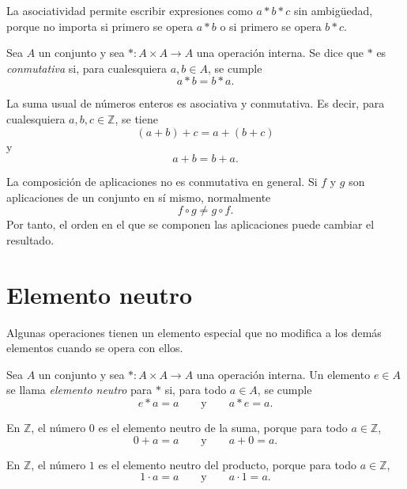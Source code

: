 La asociatividad permite escribir expresiones como \(a*b*c\) sin ambigüedad, porque no importa si primero se opera \(a*b\) o si primero se opera \(b*c\).

\begin{definicion}[Conmutatividad]
Sea \(A\) un conjunto y sea \(*:A\times A\to A\) una operación interna. Se dice que \(*\) es \emph{conmutativa} si, para cualesquiera \(a,b\in A\), se cumple
\[
  a*b=b*a.
\]
\end{definicion}

\begin{ejemplo}
La suma usual de números enteros es asociativa y conmutativa. Es decir, para cualesquiera \(a,b,c\in\mathbb{Z}\), se tiene
\[
  (a+b)+c=a+(b+c)
\]
y
\[
  a+b=b+a.
\]
\end{ejemplo}

\begin{ejemplo}
La composición de aplicaciones no es conmutativa en general. Si \(f\) y \(g\) son aplicaciones de un conjunto en sí mismo, normalmente
\[
  f\circ g\neq g\circ f.
\]
Por tanto, el orden en el que se componen las aplicaciones puede cambiar el resultado.
\end{ejemplo}

\section{Elemento neutro}

Algunas operaciones tienen un elemento especial que no modifica a los demás elementos cuando se opera con ellos.

\begin{definicion}
Sea \(A\) un conjunto y sea \(*:A\times A\to A\) una operación interna. Un elemento \(e\in A\) se llama \emph{elemento neutro} para \(*\) si, para todo \(a\in A\), se cumple
\[
  e*a=a
  \qquad\text{y}\qquad
  a*e=a.
\]
\end{definicion}

\begin{ejemplo}
En \(\mathbb{Z}\), el número \(0\) es el elemento neutro de la suma, porque para todo \(a\in\mathbb{Z}\),
\[
  0+a=a
  \qquad\text{y}\qquad
  a+0=a.
\]
\end{ejemplo}

\begin{ejemplo}
En \(\mathbb{Z}\), el número \(1\) es el elemento neutro del producto, porque para todo \(a\in\mathbb{Z}\),
\[
  1\cdot a=a
  \qquad\text{y}\qquad
  a\cdot 1=a.
\]
\end{ejemplo}

